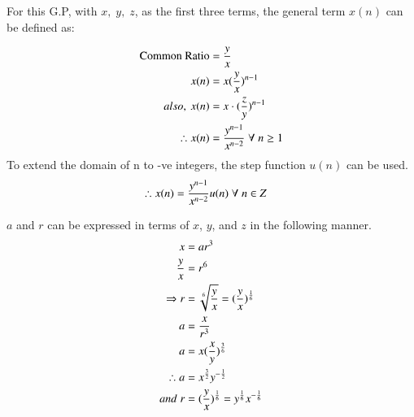 \documentclass[journal,12pt,twocolumn]{IEEEtran}
\theoremstyle{remark}
\begin{document}
For this G.P, with $x,\;y,\;z$, as the first three terms, the general term $x(n)$ can be defined as: 

\begin{align}
 \notag \text{Common Ratio}&=\frac{y}{x} \\
 x(n)&=x({\frac{y}{x}})^{n-1} \\
 also,\: x(n)&=x\cdot (\frac{z}{y})^{n-1} \\
 \notag \therefore x(n)&=\frac{y^{n-1}}{x^{n-2}}\; \forall\; n\geq1
\end{align}
To extend the domain of n to -ve integers, the step function $u(n)$ can be used.
\begin{align}
 \notag    \therefore x(n) &= \frac{y^{n-1}}{x^{n-2}} u(n) \; \forall \;n\in Z
\end{align}

$a$ and $r$ can be expressed in terms of $x$, $y$, and $z$ in the following manner.
\begin{align}
 \notag      x&=ar^3 \\
 \notag    \frac{y}{x}&=r^6 \\
 \Rightarrow r&=\sqrt[6]{\frac{y}{x}}=(\frac{y}{x})^{\frac{1}{6}}\\
 \notag    a&=\frac{x}{r^3}\\
 \notag    a&=x(\frac{x}{y})^{\frac{3}{6}}\\
 \therefore a&=x^{\frac{3}{2}}y^{-\frac{1}{2}} \\
 and\; r&=(\frac{y}{x})^{\frac{1}{6}}= y^{\frac{1}{6}}x^{-\frac{1}{6}}
\end{align}
\end{document}
